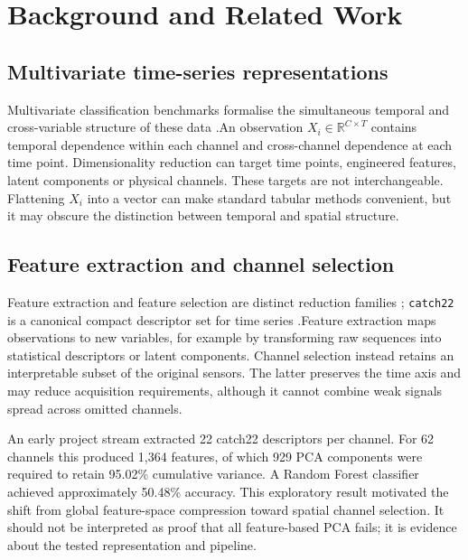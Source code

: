 \chapter{Background and Related Work}
\label{chap:background}

\section{Multivariate time-series representations}
Multivariate classification benchmarks formalise the simultaneous temporal
and cross-variable structure of these data
\citep{bagnall2017bakeoff,ruiz2021multivariate}.An observation $X_i\in\mathbb{R}^{C\times T}$ contains temporal dependence within each channel and cross-channel dependence at each time point. Dimensionality reduction can target time points, engineered features, latent components or physical channels. These targets are not interchangeable. Flattening $X_i$ into a vector can make standard tabular methods convenient, but it may obscure the distinction between temporal and spatial structure.

\section{Feature extraction and channel selection}
Feature extraction and feature selection are distinct reduction families
\citep{guyon2003feature,chandrashekar2014feature,kohavi1997wrappers,
peng2005mrmr}; \texttt{catch22} is a canonical compact descriptor set for
time series \citep{lubba2019catch22}.Feature extraction maps observations to new variables, for example by transforming raw sequences into statistical descriptors or latent components. Channel selection instead retains an interpretable subset of the original sensors. The latter preserves the time axis and may reduce acquisition requirements, although it cannot combine weak signals spread across omitted channels.

An early project stream extracted 22 catch22 descriptors per channel. For 62 channels this produced 1,364 features, of which 929 PCA components were required to retain 95.02\% cumulative variance. A Random Forest classifier achieved approximately 50.48\% accuracy. This exploratory result motivated the shift from global feature-space compression toward spatial channel selection. It should not be interpreted as proof that all feature-based PCA fails; it is evidence about the tested representation and pipeline.

